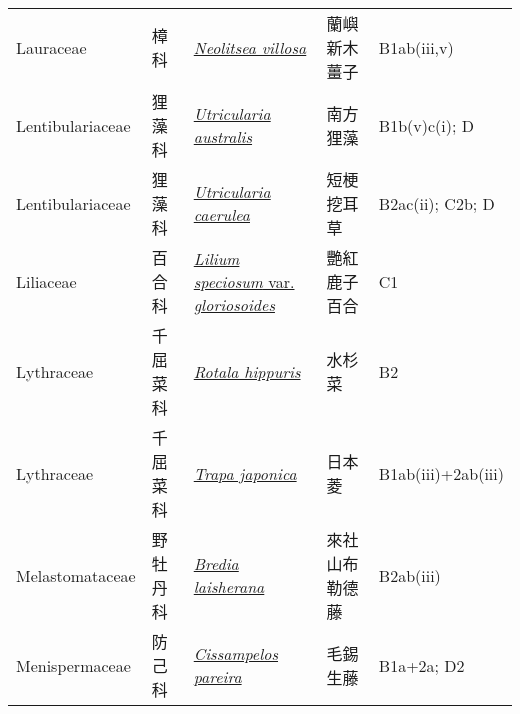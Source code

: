 {\begin{longtable}{L{2.5cm}L{2cm}L{5cm}L{2.5cm}L{3cm}}
    Lauraceae & 樟科 & \href{http://www.theplantlist.org/tpl1.1/search?q=Neolitsea+villosa}{\textit{Neolitsea villosa} } & 蘭嶼新木薑子 & B1ab(iii,v)    \\
    Lentibulariaceae & 狸藻科 & \href{http://www.theplantlist.org/tpl1.1/search?q=Utricularia+australis}{\textit{Utricularia australis} } & 南方狸藻 & B1b(v)c(i); D    \\
    Lentibulariaceae & 狸藻科 & \href{http://www.theplantlist.org/tpl1.1/search?q=Utricularia+caerulea}{\textit{Utricularia caerulea} } & 短梗挖耳草 & B2ac(ii); C2b; D    \\
    Liliaceae & 百合科 & \href{http://www.theplantlist.org/tpl1.1/search?q=Lilium+speciosum+var.+gloriosoides}{\textit{Lilium speciosum} var. \textit{gloriosoides} } & 艷紅鹿子百合 & C1    \\
    Lythraceae & 千屈菜科 & \href{http://www.theplantlist.org/tpl1.1/search?q=Rotala+hippuris}{\textit{Rotala hippuris} } & 水杉菜 & B2    \\
    Lythraceae & 千屈菜科 & \href{http://www.theplantlist.org/tpl1.1/search?q=Trapa+japonica}{\textit{Trapa japonica} } & 日本菱 & B1ab(iii)+2ab(iii)    \\
    Melastomataceae & 野牡丹科 & \href{http://www.theplantlist.org/tpl1.1/search?q=Bredia+laisherana}{\textit{Bredia laisherana} } & 來社山布勒德藤 & B2ab(iii)    \\
    Menispermaceae & 防己科 & \href{http://www.theplantlist.org/tpl1.1/search?q=Cissampelos+pareira}{\textit{Cissampelos pareira} } & 毛錫生藤 & B1a+2a; D2    \\

\end{longtable}}
